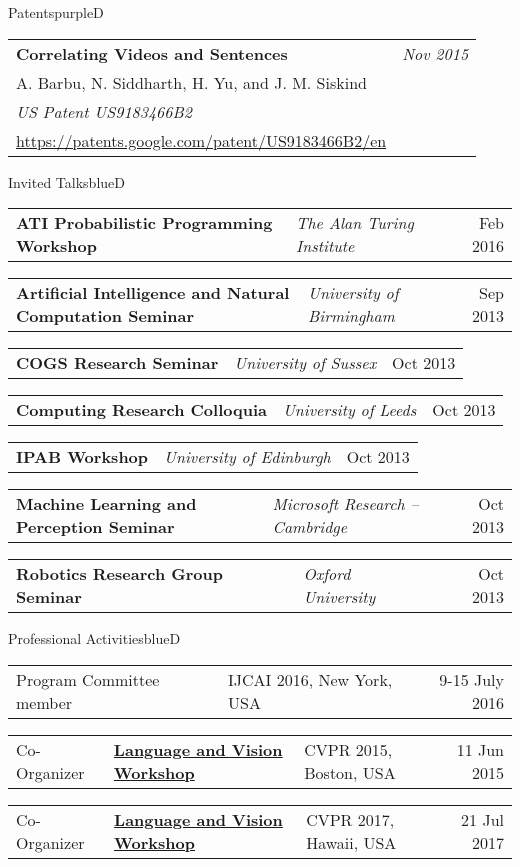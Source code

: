\documentclass[a4paper]{article}
\makeatletter
\newlength{\itemtextwidth}
\newenvironment{publication}[5]
{ \item
  \begin{tabular*}{\itemtextwidth}{@{}p{5.6in}@{\extracolsep{\fill}}r@{}}
    \textbf{#1} & \textit{#2}\\ #3 &\\ \textit{#4}&\\ #5
  \end{tabular*}
  \vspace*{-2pt}
} {}
\newenvironment{talk}[3]
{ \item
  \begin{tabular*}{\itemtextwidth}{@{}l@{\hspace*{2ex}}l@{\extracolsep{\fill}}r@{}}
    \textbf{#1} & \textit{#2} & #3
  \end{tabular*}
  \vspace*{-2pt}
} {}
\newenvironment{workshop}[5]
{ \item
  \begin{tabular*}{\itemtextwidth}{@{}ll@{\hspace*{1ex}}l@{\extracolsep{\fill}}r@{}}
    #1 & \href{#3}{\textbf{#2}} & {\small #4} & #5
  \end{tabular*}
  \vspace*{-2pt}
} {}
\def\item{\addtocounter{enumi}{-2}\oldItem}
\makeatother
\begin{document}
\begin{region}[P][1]{Patents}{purpleD}
  \begin{publication} {Correlating Videos and Sentences}
    {Nov 2015}                  %
    {A. Barbu, N. Siddharth, H. Yu, and J. M. Siskind}
    {US Patent US9183466B2}
    {\url{https://patents.google.com/patent/US9183466B2/en}}
  \end{publication}
\end{region}

\begin{region}{Invited Talks}{blueD}
  \begin{talk} {ATI Probabilistic Programming Workshop}
    {The Alan Turing Institute}
    {Feb 2016}
  \end{talk}
  \begin{talk} {Artificial Intelligence and Natural Computation Seminar}
    {University of Birmingham}
    {Sep 2013}
  \end{talk}
  \begin{talk}{COGS Research Seminar}
    {University of Sussex}
    {Oct 2013}
  \end{talk}
  \begin{talk} {Computing Research Colloquia}
    {University of Leeds}
    {Oct 2013}
  \end{talk}
  \begin{talk} {IPAB Workshop}
    {University of Edinburgh}
    {Oct 2013}
  \end{talk}
  \begin{talk} {Machine Learning and Perception Seminar}
    {Microsoft Research -- Cambridge}
    {Oct 2013}
  \end{talk}
  \begin{talk} {Robotics Research Group Seminar}
    {Oxford University}
    {Oct 2013}
  \end{talk}
\end{region}

\begin{region}{Professional Activities}{blueD}
  \begin{workshop} {Program Committee member}
    {}
    {}
    {IJCAI 2016, New York, USA}
    {9-15 July 2016}
  \end{workshop}
  \begin{workshop} {Co-Organizer}
    {Language and Vision Workshop}
    {www.languageandvision.com}
    {CVPR 2015, Boston, USA}
    {11 Jun 2015}
  \end{workshop}
  \begin{workshop} {Co-Organizer}
    {Language and Vision Workshop}
    {www.languageandvision.com}
    {CVPR 2017, Hawaii, USA}
    {21 Jul 2017}
  \end{workshop}
\end{region}
\end{document}
